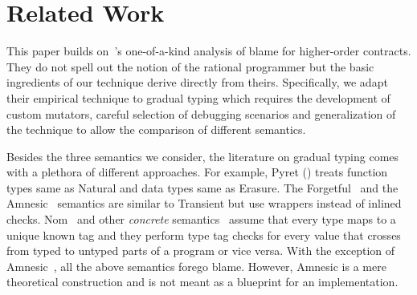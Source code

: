 \section{Related Work}

This paper builds on~\citet{lksfd-popl-2020}'s one-of-a-kind analysis of
blame for higher-order contracts. They do not spell out the notion of the
rational programmer but the basic ingredients of our technique derive
directly from theirs. Specifically, we adapt their empirical technique to
gradual typing which requires the development of custom
mutators, careful selection of debugging scenarios and generalization of
the technique to allow the comparison of different semantics. 

Besides the three semantics we consider, the literature on gradual typing
comes with a plethora of different approaches. For example, Pyret
() treats function types same as Natural
and data types same as Erasure. The Forgetful~\cite{cl-icfp-2017} and the
Amnesic~\cite{gfd-oopsla-2019} semantics are similar  to Transient but
use wrappers instead of inlined checks.  Nom~\cite{mt-oopsla-2017} and
other \emph{concrete\/} semantics~\cite{wnlov-popl-2010, rsfbv-popl-2015,
mt-oopsla-2017, rzv-ecoop-2015, rat-oopsla-2017} assume that every type
maps to a unique known tag and they perform type tag checks  for every
value that crosses from typed to untyped parts of a program or vice versa.
With the exception of Amnesic~\cite{gfd-oopsla-2019}, all the above
semantics forego blame. However, Amnesic is a mere
theoretical construction and is not meant as a blueprint for an
implementation. 
 
